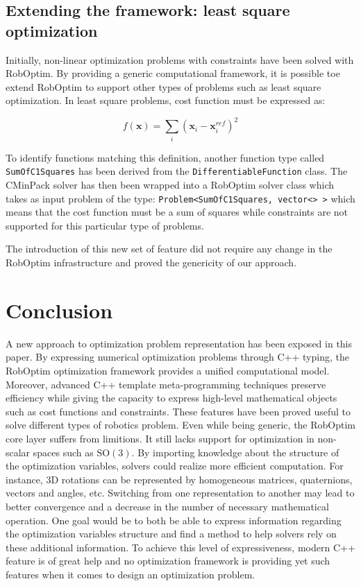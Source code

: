 \documentclass[conference,final,a4paper,twocolumn,9pt]{IEEEtran}
\begin{document}
\subsection{Extending the framework: least square optimization}


Initially, non-linear optimization problems with constraints have been
solved with RobOptim. By providing a generic computational framework,
it is possible toe extend RobOptim to support other types of problems
such as least square optimization. In least square problems, cost
function must be expressed as:

\begin{equation}
  f(\mathbf{x}) = \sum_i (\mathbf{x}_i - \mathbf{x}^{ref}_i)^2
\end{equation}


To identify functions matching this definition, another function type
called \texttt{SumOfC1Squares} has been derived from the
\texttt{DifferentiableFunction} class. The CMinPack solver has then
been wrapped into a RobOptim solver class which takes as input problem
of the type: \texttt{Problem<SumOfC1Squares, vector<> >} which means
that the cost function must be a sum of squares while constraints are
not supported for this particular type of problems.

The introduction of this new set of feature did not require any change
in the RobOptim infrastructure and proved the genericity of our
approach.


\section{Conclusion}\label{sec:conclusion}


A new approach to optimization problem representation has been exposed
in this paper. By expressing numerical optimization problems through
C++ typing, the RobOptim optimization framework provides a unified
computational model. Moreover, advanced C++ template meta-programming
techniques preserve efficiency while giving the capacity to express
high-level mathematical objects such as cost functions and
constraints. These features have been proved useful to solve different
types of robotics problem. Even while being generic, the RobOptim core
layer suffers from limitions. It still lacks support for optimization
in non-scalar spaces such as $\text{SO}(3)$. By importing knowledge
about the structure of the optimization variables, solvers could
realize more efficient computation. For instance, \mbox{3D} rotations
can be represented by homogeneous matrices, quaternions, vectors and
angles, etc. Switching from one representation to another may lead to
better convergence and a decrease in the number of necessary
mathematical operation. One goal would be to both be able to express
information regarding the optimization variables structure and find a
method to help solvers rely on these additional information. To
achieve this level of expressiveness, modern C++ feature is of great
help and no optimization framework is providing yet such features when
it comes to design an optimization problem.
\end{document}
